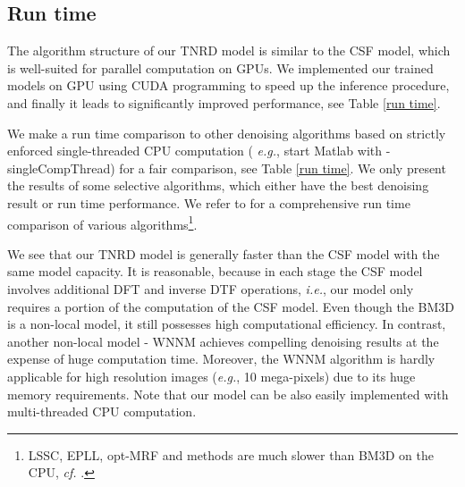 \documentclass[10pt,journal,compsoc]{IEEEtran}
\newcommand{\eg}{\emph{e.g.}}
\newcommand{\ie}{\emph{i.e.}}
\begin{document}
\begin{comment}
\begin{figure}[t!]
\vspace*{-0.5cm}
   \hspace*{-0.6cm} \texttt{[image: figures/TNRD\_comparison.pdf]}
\vspace*{-0.25cm}
    \caption{Scatter plot of the PSNRs over 68 test images produced by our  model, 
BM3D, WNNM, . A point above the diagonal line (\ie, ) means a better performance than 
our model, and a point below this line indicates a inferior result. One can see that our  model 
outperforms BM3D and  on all test images, while the WNNM algorithm can produce better results on 
few images.}
\vspace*{-0.25cm}
\label{fig:comparison}
\end{figure}
\end{comment}
\subsection{Run time} 
The algorithm structure of our TNRD model is similar to the CSF model, which is well-suited 
for parallel computation on GPUs. We implemented our trained models on GPU using CUDA programming to 
speed up the inference procedure, and finally it leads to significantly improved 
performance, see Table \ref{run time}. 
\begin{comment}
We see that for the images of size up to , 
the  model is still able to  
accomplish the denoising task in less than 1s. 
\end{comment}
We make a run time comparison to other denoising algorithms based on strictly enforced single-threaded CPU computation (
\eg, start Matlab with -singleCompThread) for a fair comparison, see Table \ref{run time}. We only 
present the results of some selective algorithms, which either have the best denoising result or run time performance. 
We refer to \cite{CSF2014} for a comprehensive run time comparison of various algorithms\footnote{
LSSC, EPLL, opt-MRF and  methods are much slower than BM3D on the CPU, \textit{cf.} \cite{CSF2014}. }.

We see that our TNRD model is generally faster than the CSF model with the same model capacity. 
It is reasonable, because in each stage the CSF model involves additional DFT and inverse DTF operations, \ie, 
our model only requires a portion of the computation of the CSF model. Even though the BM3D is a non-local model, 
it still possesses high computational efficiency. In contrast, another non-local model - WNNM achieves compelling 
denoising results at the expense of huge computation time. Moreover, the WNNM algorithm is hardly applicable for 
high resolution images (\eg, 10 mega-pixels) due to its huge memory requirements. 
Note that our model can be also easily implemented with multi-threaded CPU computation. 
\end{document}
